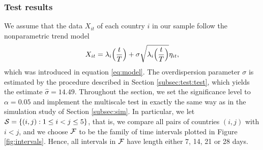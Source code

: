 \documentclass[a4paper,12pt]{article}
\numberwithin{equation}{section}
\begin{document}



\subsubsection{Test results}


We assume that the data $X_{it}$ of each country $i$ in our sample follow the nonparametric trend model 
\[ X_{it} = \lambda_i\Big(\frac{t}{T}\Big) + \sigma \sqrt{\lambda_i\Big(\frac{t}{T}\Big)} \eta_{it}, \]
which was introduced in equation \eqref{eq:model}. The overdispersion parameter $\sigma$ is estimated by the procedure described in Section \ref{subsec:test:test}, which yields the estimate $\widehat{\sigma} = 14.49$. Throughout the section, we set the significance level to $\alpha=0.05$ and implement the multiscale test in exactly the same way as in the simulation study of Section \ref{subsec:sim}. In particular, we let $\mathcal{S} = \{ (i,j): 1 \le i < j \le 5\}$, that is, we compare all pairs of countries $(i,j)$ with $i < j$, and we choose $\mathcal{F}$ to be the family of time intervals plotted in Figure \ref{fig:intervals}. Hence, all intervals in $\mathcal{F}$ have length either 7, 14, 21 or 28 days. 
\end{document}
